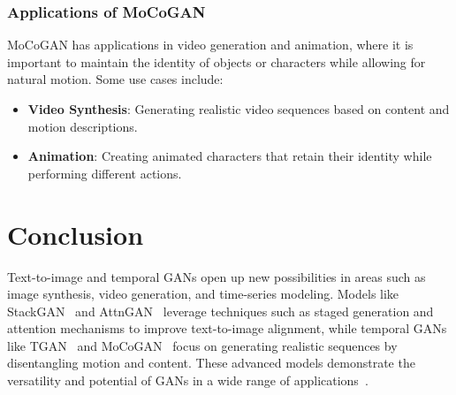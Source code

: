 \subsubsection{Applications of MoCoGAN}

MoCoGAN has applications in video generation and animation, where it is important to maintain the identity of objects or characters while allowing for natural motion. Some use cases include:
\begin{itemize}
    \item \textbf{Video Synthesis}: Generating realistic video sequences based on content and motion descriptions.
    \item \textbf{Animation}: Creating animated characters that retain their identity while performing different actions.
\end{itemize}

\section{Conclusion}

Text-to-image and temporal GANs open up new possibilities in areas such as image synthesis, video generation, and time-series modeling. Models like StackGAN~\cite{zhang2017stackgan} and AttnGAN~\cite{xu2017attngan} leverage techniques such as staged generation and attention mechanisms to improve text-to-image alignment, while temporal GANs like TGAN~\cite{xie2018tempogan} and MoCoGAN~\cite{tulyakov2017mocogan} focus on generating realistic sequences by disentangling motion and content. These advanced models demonstrate the versatility and potential of GANs in a wide range of applications~\cite{li2024survey}.
